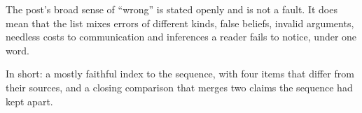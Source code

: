 \begin{afterword}
The post's broad sense of ``wrong'' is stated openly and is not a fault. It does mean that the list mixes errors of different kinds, false beliefs, invalid arguments, needless costs to communication and inferences a reader fails to notice, under one word.

In short: a mostly faithful index to the sequence, with four items that differ from their sources, and a closing comparison that merges two claims the sequence had kept apart.
\end{afterword}

